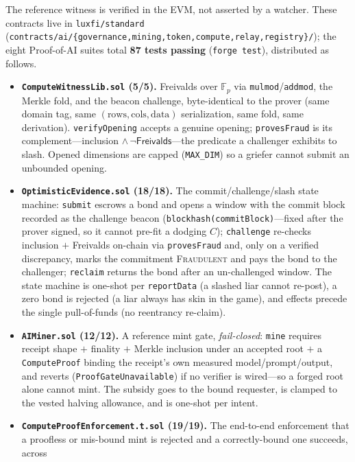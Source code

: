 The reference witness is verified in the EVM, not asserted by a watcher. These contracts
live in \texttt{luxfi/standard} (\texttt{contracts/ai/\{governance,mining,token,compute,relay,registry\}/}); the eight Proof-of-AI
suites total \textbf{87 tests passing} (\texttt{forge test}), distributed as follows.

\begin{itemize}[leftmargin=1.4em]
\item \textbf{\texttt{ComputeWitnessLib.sol} (5/5).} Freivalds over $\mathbb{F}_p$ via
\texttt{mulmod}/\texttt{addmod}, the Merkle fold, and the beacon challenge, byte-identical
to the prover (same domain tag, same $(\text{rows},\text{cols},\text{data})$ serialization,
same fold, same derivation). \texttt{verifyOpening} accepts a genuine opening;
\texttt{provesFraud} is its complement---inclusion $\wedge\,\neg\mathsf{Freivalds}$---the
predicate a challenger exhibits to slash. Opened dimensions are capped
(\texttt{MAX\_DIM}) so a griefer cannot submit an unbounded opening.
\item \textbf{\texttt{OptimisticEvidence.sol} (18/18).} The commit/challenge/slash state
machine: \texttt{submit} escrows a bond and opens a window with the commit block recorded
as the challenge beacon (\texttt{blockhash(commitBlock)}---fixed after the prover signed,
so it cannot pre-fit a dodging $C$); \texttt{challenge} re-checks inclusion $+$ Freivalds
on-chain via \texttt{provesFraud} and, only on a verified discrepancy, marks the commitment
\textsc{Fraudulent} and pays the bond to the challenger; \texttt{reclaim} returns the bond
after an un-challenged window. The state machine is one-shot per \texttt{reportData} (a
slashed liar cannot re-post), a zero bond is rejected (a liar always has skin in the game),
and effects precede the single pull-of-funds (no reentrancy re-claim).
\item \textbf{\texttt{AIMiner.sol} (12/12).} A reference mint gate, \emph{fail-closed}:
\texttt{mine} requires receipt shape $+$ finality $+$ Merkle inclusion under an accepted
root $+$ a \texttt{ComputeProof} binding the receipt's own measured model/prompt/output,
and reverts (\texttt{ProofGateUnavailable}) if no verifier is wired---so a forged root alone
cannot mint. The subsidy goes to the bound requester, is clamped to the vested halving
allowance, and is one-shot per intent.
\item \textbf{\texttt{ComputeProofEnforcement.t.sol} (19/19).} The end-to-end enforcement
that a proofless or mis-bound mint is rejected and a correctly-bound one succeeds, across

\end{itemize}
